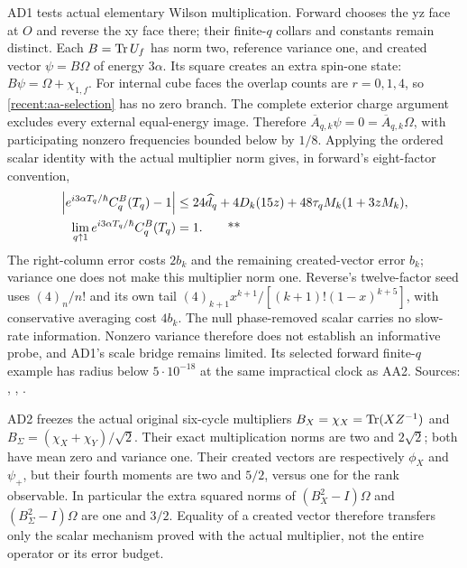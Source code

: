 AD1 tests actual elementary Wilson multiplication.  Forward chooses the yz face
at $O$ and reverse the xy face there; their finite-$q$ collars and constants
remain distinct.  Each $B=\operatorname{Tr} U_f$ has norm two, reference variance one, and
created vector $\psi=B\Omega$ of energy $3\alpha$.  Its square creates an
extra spin-one state: $B\psi=\Omega+\chi_{1,f}$.
For internal cube faces the overlap counts are $r=0,1,4$, so
\eqref{recent:aa-selection} has no zero branch.  The complete exterior charge
argument excludes every external equal-energy image.  Therefore
$\overline A_{q,k}\psi=0=\overline A_{q,k}\Omega$, with participating nonzero
frequencies bounded below by $1/8$.  Applying the ordered scalar identity with
the actual multiplier norm gives, in forward's eight-factor convention,
\begin{align}
 \left|e^{i3\alpha T_q/\hbar}C_q^B(T_q)-1\right|
 &\le24\widehat d_q+4D_k(15z)+48\tau_qM_k(1+3zM_k),\notag\\
 \lim_{q\uparrow1}e^{i3\alpha T_q/\hbar}C_q^B(T_q)&=1.
 \qquad\text{**}
 \label{recent:null-wilson}
\end{align}
The right-column error costs $2b_k$ and the remaining created-vector error
$b_k$; variance one does not make this multiplier norm one.
Reverse's twelve-factor seed uses $(4)_n/n!$ and its own tail
$(4)_{k+1}x^{k+1}/[(k+1)!(1-x)^{k+5}]$, with conservative averaging cost $4b_k$.
The null phase-removed scalar carries no slow-rate information.  Nonzero
variance therefore does not establish an informative probe, and AD1's scale
bridge remains limited.  Its selected forward finite-$q$ example has radius
below $5\cdot10^{-18}$ at the same impractical clock as AA2.
Sources: ,
,
.

AD2 freezes the actual original six-cycle multipliers
$B_X=\chi_X=\operatorname{Tr}(XZ^{-1})$ and
$B_\Sigma=(\chi_X+\chi_Y)/\sqrt2$.  Their exact multiplication norms are two
and $2\sqrt2$; both have mean zero and variance one.  Their created vectors
are respectively $\phi_X$ and $\psi_+$, but their fourth moments are two and
$5/2$, versus one for the rank observable.  In particular the extra squared
norms of $(B_X^2-I)\Omega$ and $(B_\Sigma^2-I)\Omega$ are one and $3/2$.
Equality of a created vector therefore transfers only the scalar mechanism
proved with the actual multiplier, not the entire operator or its error budget.


